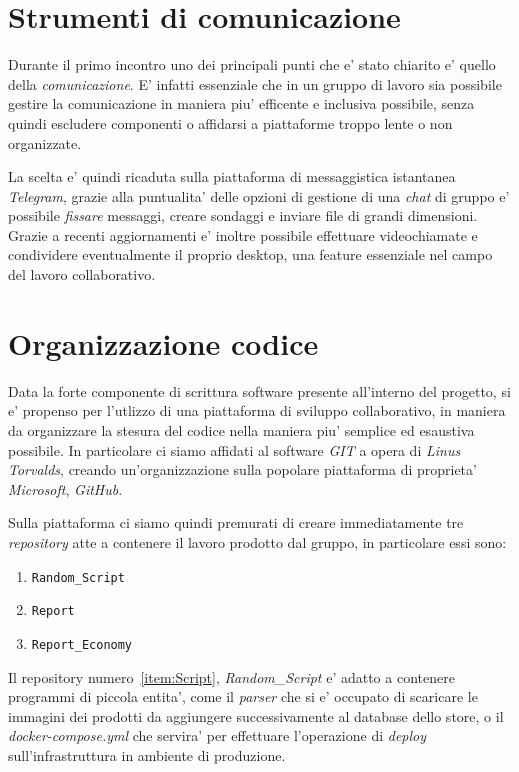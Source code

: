 \documentclass[a4paper]{report}
\begin{document}
	\section{Strumenti di comunicazione}\label{strumenti di comunicazione}
		Durante il primo incontro uno dei principali punti che e' stato chiarito e' quello della \emph{comunicazione}.
		E' infatti essenziale che in un gruppo di lavoro sia possibile gestire la comunicazione in maniera piu'
		efficente e inclusiva possibile, senza quindi escludere componenti o affidarsi a piattaforme troppo lente o non
		organizzate.
		
		La scelta e' quindi ricaduta sulla piattaforma di messaggistica istantanea \emph{Telegram}, grazie alla
		puntualita' delle opzioni di gestione di una \emph{chat} di gruppo e' possibile \emph{fissare} messaggi, creare
		sondaggi e inviare file di grandi dimensioni. Grazie a recenti aggiornamenti e' inoltre possibile effettuare
		videochiamate e condividere eventualmente il proprio desktop, una feature essenziale nel campo del lavoro
		collaborativo.
	\section{Organizzazione codice}\label{organizzazione codice}
		Data la forte componente di scrittura software presente all'interno del progetto, si e' propenso per l'utlizzo
		di una piattaforma di sviluppo collaborativo, in maniera da organizzare la stesura del codice nella maniera piu'
		semplice ed esaustiva possibile. In particolare ci siamo affidati al software \emph{GIT} a opera di \emph{Linus
		Torvalds}, creando un'organizzazione sulla popolare piattaforma di proprieta' \emph{Microsoft}, \emph{GitHub}.

		Sulla piattaforma ci siamo quindi premurati di creare immediatamente tre \emph{repository} atte a contenere il
		lavoro prodotto dal gruppo, in particolare essi sono:
		\begin{enumerate}
			\item \texttt{Random\_Script}\label{item:Script}
			\item \texttt{Report}\label{item:Report}
			\item \texttt{Report\_Economy}\label{item:ReportE}
		\end{enumerate}

		Il repository numero~\ref{item:Script}{, \emph{Random\_Script}} e' adatto a contenere programmi di piccola
		entita', come il \emph{parser} che si e' occupato di scaricare le immagini dei prodotti da aggiungere
		successivamente al database dello store, o il \emph{docker-compose.yml} che servira' per effettuare l'operazione
		di \emph{deploy} sull'infrastruttura in ambiente di produzione.
\end{document}
